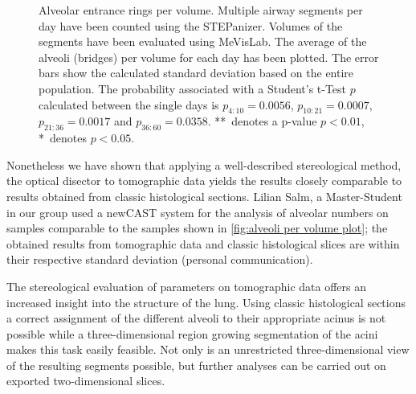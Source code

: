 \begin{figure}[htb]%
	\centering
	\caption[Alveolar entrance rings per volume]{Alveolar entrance rings per volume. Multiple airway segments per day have been counted using the STEPanizer. Volumes of the segments have been evaluated using MeVisLab. The average of the alveoli (bridges) per volume for each day has been plotted. The error bars show the calculated standard deviation based on the entire population. The probability associated with a Student's t-Test $p$ calculated between the single days is $p_{4:10}=0.0056$, $p_{10:21}=0.0007$, $p_{21:36}=0.0017$ and $p_{36:60}=0.0358$. **~denotes a p-value $p<0.01$, *~denotes $p<0.05$.}
	\label{fig:alveoli per volume plot}
\end{figure}%

Nonetheless we have shown that applying a well-described stereological method, the optical disector \cite{Hsia2010} to tomographic data yields the results closely comparable to results obtained from classic histological sections. Lilian Salm, a Master-Student in our group used a newCAST  system for the analysis of alveolar numbers on samples comparable to the samples shown in \autoref{fig:alveoli per volume plot}; the obtained results from tomographic data and classic histological slices are within their respective standard deviation (personal communication).

The stereological evaluation of parameters on tomographic data offers an increased insight into the structure of the lung. Using classic histological sections a correct assignment of the different alveoli to their appropriate acinus is not possible while a three-dimensional region growing segmentation of the acini makes this task easily feasible. Not only is an unrestricted three-dimensional view of the resulting segments possible, but further analyses can be carried out on exported two-dimensional slices.